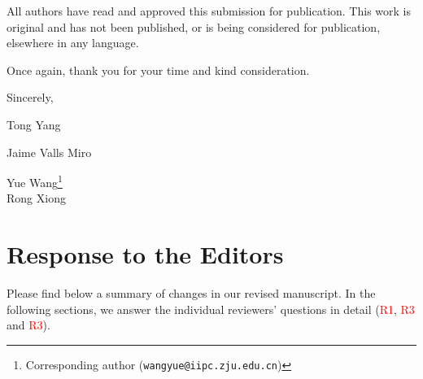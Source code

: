 \documentclass[11pt]{article}
\begin{document}
\par \bigskip All authors have read and approved this submission for publication. This work is original and has not been published, or is being considered for publication, elsewhere in any language. 

\par \bigskip Once again, thank you for your time and kind consideration. 

\bigskip
Sincerely,
\par \bigskip
Tong Yang \par 
Jaime Valls Miro \par
Yue Wang\footnote{Corresponding author (\texttt{wangyue@iipc.zju.edu.cn})}\\
Rong Xiong \\

\clearpage

\section*{Response to the Editors}
Please find below %
a summary of changes in our revised manuscript. In the following sections, we answer the individual reviewers' questions in detail (\textcolor{red}{R1}, \textcolor{red}{R3} and \textcolor{red}{R3}).
\end{document}

